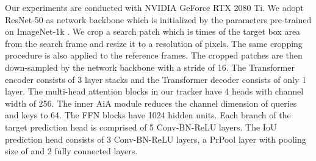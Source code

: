 \documentclass[runningheads]{llncs}
\begin{document}
Our experiments are conducted with NVIDIA GeForce RTX 2080 Ti. We adopt ResNet-50 \cite{he2016deep} as network backbone which is initialized by the parameters pre-trained on ImageNet-1k \cite{deng2009imagenet}. We crop a search patch which is  times of the target box area from the search frame and resize it to a resolution of  pixels. The same cropping procedure is also applied to the reference frames. The cropped patches are then down-sampled by the network backbone with a stride of 16. The Transformer encoder consists of 3 layer stacks and the Transformer decoder consists of only 1 layer. The multi-head attention blocks in our tracker have 4 heads with channel width of 256. The inner AiA module reduces the channel dimension of queries and keys to 64. The FFN blocks have 1024 hidden units. Each branch of the target prediction head is comprised of 5 Conv-BN-ReLU layers. The IoU prediction head consists of 3 Conv-BN-ReLU layers, a PrPool \cite{jiang2018acquisition} layer with pooling size of  and 2 fully connected layers.
\end{document}

